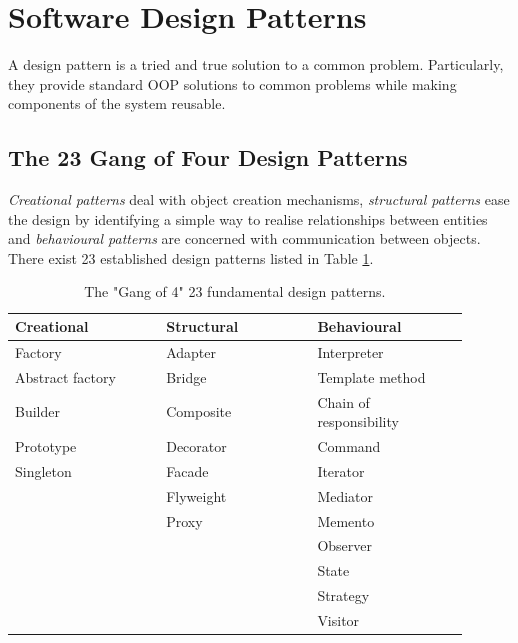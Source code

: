 \documentclass[a4paper]{article}
\begin{document}
\section{Software Design Patterns}

A design pattern is a tried and true solution to a common problem. Particularly, they provide standard OOP solutions to common problems while making components of the system reusable. 


\subsection{The 23 Gang of Four Design Patterns}

\textit{Creational patterns} deal with object creation mechanisms, \textit{structural patterns} ease the design by identifying a simple way to realise
relationships between entities and \textit{behavioural patterns} are concerned with communication between objects. There exist 23 established design patterns listed in Table \ref{tab:gang_of_four_23}.

\begin{table}[H]
  \centering
  \begin{tabular}{p{0.3\linewidth}|p{0.3\linewidth}|p{0.3\linewidth}}
    \textbf{Creational} & \textbf{Structural} & \textbf{Behavioural} \\
    \midrule
    Factory          & Adapter   & Interpreter  \\
    Abstract factory & Bridge    & Template method \\
    Builder          & Composite & Chain of responsibility \\
    Prototype        & Decorator & Command \\
    Singleton        & Facade    & Iterator \\
                     & Flyweight & Mediator \\
                     & Proxy     & Memento \\
                     &           & Observer \\
                     &           & State \\
                     &           & Strategy \\
                     &           & Visitor \\
    \hline
  \end{tabular}
  \caption{The "Gang of 4" 23 fundamental design patterns.}
  \label{tab:gang_of_four_23}
\end{table}
\end{document}
